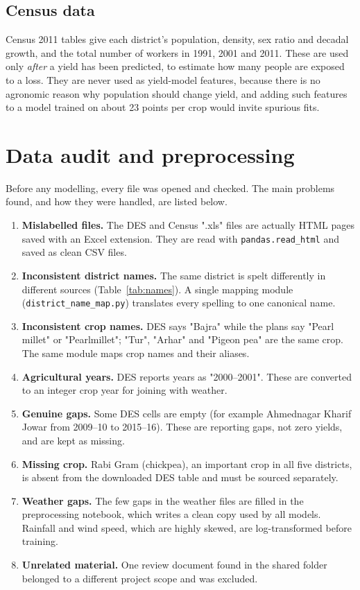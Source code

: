 \subsection{Census data}
Census 2011 tables give each district's population, density, sex ratio and decadal growth, and the total number of workers in 1991, 2001 and 2011. These are used only \emph{after} a yield has been predicted, to estimate how many people are exposed to a loss. They are never used as yield-model features, because there is no agronomic reason why population should change yield, and adding such features to a model trained on about 23 points per crop would invite spurious fits.

\section{Data audit and preprocessing}
Before any modelling, every file was opened and checked. The main problems found, and how they were handled, are listed below.

\begin{enumerate}
	\item \textbf{Mislabelled files.} The DES and Census ".xls" files are actually HTML pages saved with an Excel extension. They are read with \texttt{pandas.read\_html} and saved as clean CSV files.
	\item \textbf{Inconsistent district names.} The same district is spelt differently in different sources (Table~\ref{tab:names}). A single mapping module (\texttt{district\_name\_map.py}) translates every spelling to one canonical name.
	\item \textbf{Inconsistent crop names.} DES says "Bajra" while the plans say "Pearl millet" or "Pearlmillet"; "Tur", "Arhar" and "Pigeon pea" are the same crop. The same module maps crop names and their aliases.
	\item \textbf{Agricultural years.} DES reports years as "2000--2001". These are converted to an integer crop year for joining with weather.
	\item \textbf{Genuine gaps.} Some DES cells are empty (for example Ahmednagar Kharif Jowar from 2009--10 to 2015--16). These are reporting gaps, not zero yields, and are kept as missing.
	\item \textbf{Missing crop.} Rabi Gram (chickpea), an important crop in all five districts, is absent from the downloaded DES table and must be sourced separately.
	\item \textbf{Weather gaps.} The few gaps in the weather files are filled in the preprocessing notebook, which writes a clean copy used by all models. Rainfall and wind speed, which are highly skewed, are log-transformed before training.
	\item \textbf{Unrelated material.} One review document found in the shared folder belonged to a different project scope and was excluded.
\end{enumerate}

